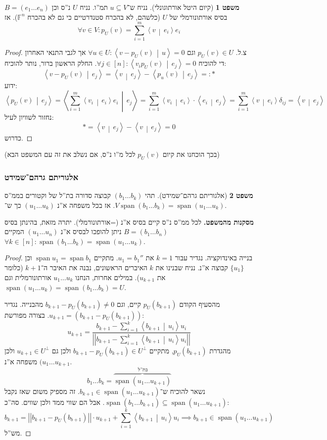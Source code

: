 \documentclass[a4paper]{article}
\newcommand\ra    {\rangle}
\newcommand\la    {\langle}
\DeclareMathOperator{\Sp}      {span}
\newcommand\F         {\mathbb{F}}
\newcommand\co        {\colon}
\newcommand\norm[1]   {\left \vert \left \vert #1 \right \vert \right \vert}
\newcommand\mut [2]   {\left \la #1 \,\middle\vert\, #2 \right \ra}
\theoremstyle{definition}
\newtheorem{Theorem}{\color{myblue}משפט}
\begin{document}
	\begin{Theorem}[קיום היטל אורתוגונלי]
		נניח ש־$u \subseteq V$ תמ''ו. נניח $U$ נ''ס וכן $B = (e_1 \dots e_n)$ בסיס אורתונורמלי של $U$ (כלשהם, לא בהכרח סטנדרטיים כי גם לא בהכרח $\F^n$). אז 
		\[ \forall v \in V \co p_U(v) = \sum_{i = 1}^{m}\mut{v}{e_i}e_i \]
	\end{Theorem}
	\begin{proof}
		צ.ל. $p_U(v) \in U$ וגם $\forall u \in U \co \mut{v - p_U(v)}{u} = 0$ אך לגבי התנאי האחרון די להוכיח $\forall j \in [n] \co \mut{v_i p_U(v)}{e_j}  = 0$. החלק הראשון ברור, נותר להוכיח: 
		\[ \mut{v - p_U(v)}{e_j} = \mut{v}{e_j} - \mut{p_u(v)}{e_j} =: * \]
		ידוע: 
		\[ \mut{p_U(v)}{e_j} = \mut{\sum_{i = 1}^{m}\mut{v_i}{e_i} e_i}{e_j} = \sum_{i = 1}^{m}\mut{v_i}{e_i} \cdot \mut{e_i}{e_j} = \sum_{i = 1}^{m}\mut{v}{e_i}\delta_{ij} = \mut{v}{e_j} \]
		נחזור לשוויון לעיל: 
		\[ *= \mut{v}{e_j} - \mut{v}{e_j} = 0 \]
		כדרוש. 
	\end{proof}
	(בכך הוכחנו את קיום $p_U(v)$ לכל מ''ו נ''ס, אם נשלב את זה עם המשפט הבא)
	
	\subsubsection{אלגוריתם גרהם־שמידט}
	\begin{Theorem}[אלגוריתם גרהם־שמידט]
		תהי $(b_1 \dots b_k)$ קבוצה סדורה בת''ל של וקטורים בממ''ס $V$. אז בכל משפחה א''נ $(u_1 \dots u_k)$ כך ש־$\Sp(b_1 \dots b_k) = \Sp(u_1 \dots u_k)$. 
	\end{Theorem}
	\textbf{מסקנות מהמשפט. }לכל ממ''ס נ''ס קיים בסיס א''נ (=אורתונורמלי). יתרה מזאת, בהינתן בסיס $B = (b_1 \dots b_n)$ ניתן להופכו לבסיס א''נ $(u_1 \dots u_n)$ המקיים $\forall k \in [n] \co \Sp (b_1 \dots b_k) = \Sp(u_1 \dots u_k)$. 
	
	\begin{proof}
		בנייה באינדוקציה. נגדיר עבור $k = 1$ את $u_1 = b_1''$. מתקיים $\Sp u_1 = \Sp b_1$ וכן $\{u_1\}$ קבוצה א''נ. נניח שבנינו את $k$ האיברים הראשונים, נבנה את האיבר ה־$k + 1$ (כלומר את $u_{k + 1}$). במילים אחרות, הנחנו $u_1 \dots u_k$ אורתונורמלית וגם $\Sp (u_1 \dots u_k) = \Sp(b_1 \dots b_k) = U$. 
		
		מהסעיף הקודם $p_U(b_{k + 1})$ קיים, וגם $b_{k + 1} - p_U(b_{k + 1}) \neq 0$ מהבנייה. נגדיר $u_{k + 1} = (b_{k + 1} - p_U(b_{k + 1}))$. בצורה מפורשת: 
		\[ u_{k + 1} = \frac{b_{k + 1} - \sum_{i = 1}^{k}\mut{b_{k + 1}}{u_i}u_i}{\norm{b_{k + 1} - \sum_{i = 1}^{k}\mut{b_{k + 1}}{u_i}u_i}} \]
		מהגדרת $p_U(b_{k + 1})$, מתקיים $b_{k + 1} - p_U(b_{k + 1}) \in U^{\perp}$ ולכן גם $u_{k + 1} \in U^{\perp}$ ולכן $(u_1 \dots u_{k + 1}$ משפחה א''נ. 
		\[ b_1 \dots b_k = \overbrace{\Sp(u_1 \dots u_{k + 1})}^{\,\!\text{בת''ל}} \]
		נשאר להוכיח ש־$b_{k + 1} \in \Sp(u_1 \dots u_{k + 1})$. זה מספיק משום שאז נקבל $\Sp(b_1 \dots b_{k + 1}) \subseteq \Sp(u_1 \dots u_{k + 1})$. אבל הם שווי ממד ולכן שווים. סה''כ: 
		\[ b_{k + 1} = \norm{b_{k + 1} - p_U(b_{b + 1})} \cdot u_{k + 1} + \sum_{i = 1}^{k}\mut{b_{k + 1}}{u_i}u_i \implies b_{k + 1} \in \Sp(u_1 \dots u_{k + 1}) \]
		מש''ל. 
	\end{proof}
	
\end{document}
